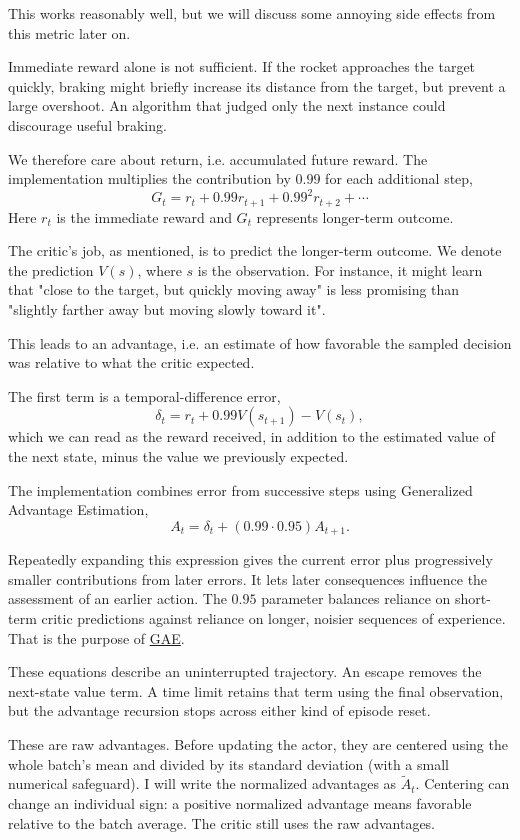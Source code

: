 \documentclass[12pt, letterpaper]{article}
\begin{document}
This works reasonably well, but we will discuss 
some annoying side effects from this metric later on. 

Immediate reward alone is not sufficient. 
If the rocket approaches the target quickly, 
braking might briefly increase its distance 
from the target, but prevent a large overshoot. An 
algorithm that judged only the next 
instance could discourage useful braking. 

We therefore care about return, i.e. accumulated 
future reward. The implementation multiplies the contribution
by $0.99$ for each additional step, 
\[
    G_t = r_t + 0.99r_{t+1} + 0.99^2r_{t+2} + \cdots
\]
Here $r_t$ is the immediate reward and $G_t$ 
represents longer-term outcome. 

The critic's job, as mentioned, is to 
predict the longer-term outcome. 
We denote the prediction $V(s)$, where $s$ is 
the observation. For instance, 
it might learn that "close to the target, but 
quickly moving away" is less promising 
than "slightly farther away but moving slowly toward 
it". 

This leads to an advantage, i.e. an estimate 
of how favorable the sampled decision was 
relative to what the critic expected. 

The first term is a temporal-difference error, 
\[
    \delta_t = r_t + 0.99 V(s_{t+1}) - V(s_t),
\]
which we can read as the reward 
received, in addition to the 
estimated value of the next state, minus 
the value we previously expected. 

The implementation combines error from 
successive steps using Generalized Advantage 
Estimation, 
\[
    A_t = \delta_t + (0.99 \cdot 0.95)A_{t+1}. 
\]

Repeatedly expanding this expression gives 
the current error plus progressively smaller 
contributions from later errors. It 
lets later consequences influence the assessment 
of an earlier action. 
The $0.95$ parameter balances reliance on short-term 
critic predictions against reliance on 
longer, noisier sequences of experience. 
That is the purpose of 
\href{https://arxiv.org/pdf/1506.02438}{GAE}. 

These equations describe an uninterrupted trajectory.
An escape removes the next-state value term. A time limit
retains that term using the final observation, but the advantage
recursion stops across either kind of episode reset.

These are raw advantages. Before updating the actor, they are
centered using the whole batch's mean and divided by its standard
deviation (with a small numerical safeguard). I will write the
normalized advantages as $\widetilde A_t$. Centering can change
an individual sign: a positive normalized advantage means
favorable relative to the batch average. The critic still uses
the raw advantages.
\end{document}
